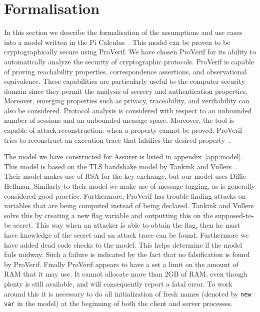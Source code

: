 \chapter{Formalisation}
\label{sec:formalisation}
In this section we describe the formalisation of the assumptions and use cases into a model written in the Pi Calculus~\cite{picalculus}. This model can be proven to be cryptographically secure using ProVerif. We have chosen ProVerif for its ability to automatically analyze the security of cryptographic protocols. ProVerif is capable of proving reachability properties, correspondence assertions, and observational equivalence. These capabilities are particularly useful to the computer security domain since they permit the analysis of secrecy and authentication properties. Moreover, emerging properties such as privacy, traceability, and verifiability can also be considered. Protocol analysis is considered with respect to an unbounded number of sessions and an unbounded message space. Moreover, the tool is capable of attack reconstruction: when a property cannot be proved, ProVerif tries to reconstruct an execution trace that falsifies the desired property~\cite{proverifmanual}.

The model we have constructed for Assurer is listed in appendix~\ref{app:model}. This model is based on the TLS handshake model by Tankink and Vullers~\cite{tankink2008verification}. Their model makes use of RSA for the key exchange, but our model uses Diffie-Hellman. Similarly to their model we make use of message tagging, as is generally considered good practice. Furthermore, ProVerif has trouble finding attacks on variables that are being computed instead of being declared. Tankink and Vullers solve this by creating a new flag variable and outputting this on the supposed-to-be secret. This way when an attacker is able to obtain the flag, then he must have knowledge of the secret and an attack trace can be found. Furthermore we have added dead code checks to the model. This helps determine if the model fails midway. Such a failure is indicated by the fact that no falsification is found by ProVerif. Finally ProVerif appears to have a set a limit on the amount of RAM that it may use. It cannot allocate more than 2GB of RAM, even though plenty is still available, and will consequently report a fatal error. To work around this it is necessary to do all initialization of fresh names (denoted by \texttt{new var} in the model) at the beginning of both the client and server processes.

